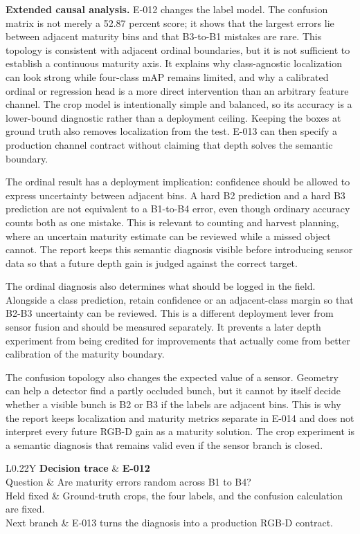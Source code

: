 \documentclass[preprint,12pt]{elsarticle}
\newcommand{\decisioncard}[4]{%
\begin{table}[H]\centering\small
\begin{tabularx}{\columnwidth}{L{0.22\columnwidth}Y}
\toprule
\textbf{Decision trace} & \textbf{#1}\\
Question & #2\\
Held fixed & #3\\
Next branch & #4\\
\bottomrule
\end{tabularx}
\end{table}}
\begin{document}
\textbf{Extended causal analysis.} E-012 changes the label model. The
confusion matrix is not merely a 52.87 percent score; it shows that the
largest errors lie between adjacent maturity bins and that B3-to-B1 mistakes
are rare. This topology is consistent with adjacent ordinal boundaries, but
it is not sufficient to establish a continuous maturity axis. It explains why
class-agnostic localization can
look strong while four-class mAP remains limited, and why a calibrated ordinal
or regression head is a more direct intervention than an arbitrary feature
channel. The crop model is intentionally simple and balanced, so its accuracy
is a lower-bound diagnostic rather than a deployment ceiling. Keeping the
boxes at ground truth also removes localization from the test. E-013 can then
specify a production channel contract without claiming that depth solves the
semantic boundary.

The ordinal result has a deployment implication: confidence should be allowed
to express uncertainty between adjacent bins. A hard B2 prediction and a hard
B3 prediction are not equivalent to a B1-to-B4 error, even though ordinary
accuracy counts both as one mistake. This is relevant to counting and harvest
planning, where an uncertain maturity estimate can be reviewed while a missed
object cannot. The report keeps this semantic diagnosis visible before
introducing sensor data so that a future depth gain is judged against the
correct target.

The ordinal diagnosis also determines what should be logged in the field.
Alongside a class prediction, retain confidence or an adjacent-class margin so
that B2-B3 uncertainty can be reviewed. This is a different deployment lever
from sensor fusion and should be measured separately. It prevents a later
depth experiment from being credited for improvements that actually come from
better calibration of the maturity boundary.

The confusion topology also changes the expected value of a sensor. Geometry
can help a detector find a partly occluded bunch, but it cannot by itself
decide whether a visible bunch is B2 or B3 if the labels are adjacent bins.
This is why the report keeps localization and maturity metrics separate in
E-014 and does not interpret every future RGB-D gain as a maturity solution.
The crop experiment is a semantic diagnosis that remains valid even if the
sensor branch is closed.

\decisioncard{E-012}{Are maturity errors random across B1 to B4?}{Ground-truth crops, the four labels, and the confusion calculation are fixed.}{E-013 turns the diagnosis into a production RGB-D contract.}
\end{document}

